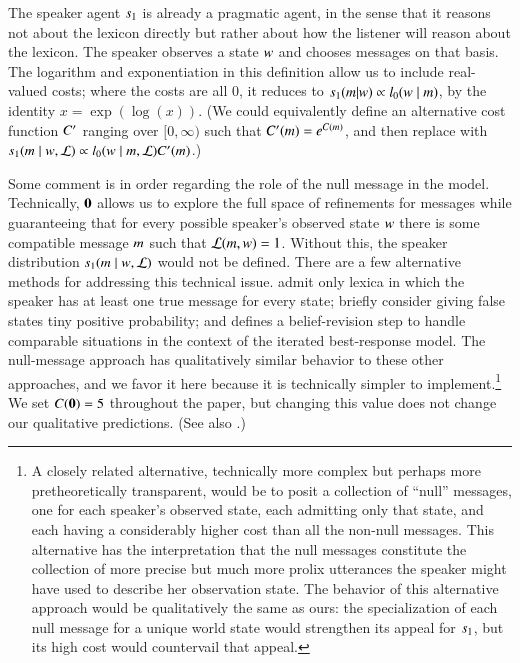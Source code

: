 \documentclass[leqno,12pt]{article}
\begin{document}

The speaker agent $s_{1}$ is already a pragmatic agent, in the
sense that it reasons not about the lexicon directly but rather about
how the listener will reason about the lexicon. The speaker observes a
state $w$ and chooses messages on that basis. The logarithm and
exponentiation in this definition allow us to include real-valued
costs; where the costs are all $0$, it reduces to
$s_{1}(m|w) \propto l_{0}(w \mid m)$,
by the identity $x = \exp(\log(x))$. (We could equivalently define an
alternative cost function $C'$ ranging over $[0,\infty)$ such
that $C'(m)=e^{C(m)}$, and then replace
 with
$s_{1}(m \mid w, \mathcal{L}) \propto
l_{0}(w \mid m,\mathcal{L}) C'(m)$.)

    

Some comment is in order regarding the role of the null message in the
model.  Technically, $\mathbf{0}$ allows us to explore the full space of
refinements for messages while guaranteeing that for every possible
speaker's observed state $w$ there is some compatible message
$m$ such that $\mathcal{L}(m, w) = 1$.  Without this, the speaker
distribution $s_{1}(m \mid w, \mathcal{L})$ would not be
defined.  There are a few alternative methods for addressing this
technical issue. \citet{Bergen:Goodman:Levy:2012} admit only lexica in
which the speaker has at least one true message for every state;
\citet{Bergen:Levy:Goodman:2014} briefly consider giving false states
tiny positive probability; and \citet{Jaeger:2011} defines a
belief-revision step to handle comparable situations in the context of
the iterated best-response model. The null-message approach has
qualitatively similar behavior to these other approaches, and we favor
it here because it is technically simpler to implement.\footnote{A
  closely related alternative, technically more complex but perhaps
  more pretheoretically transparent, would be to posit a collection of
  ``null'' messages, one for each speaker's observed state, each
  admitting only that state, and each having a considerably higher
  cost than all the non-null messages. This alternative has the
  interpretation that the null messages constitute the collection of
  more precise but much more prolix utterances the speaker might have
  used to describe her observation state.  The behavior of this
  alternative approach would be qualitatively the same as ours: the
  specialization of each null message for a unique world state would
  strengthen its appeal for $s_{1}$, but its high cost would
  countervail that appeal.}  We set $C(\mathbf{0}) = 5$ throughout
the paper, but changing this value does not change our qualitative
predictions.  (See also .)
\end{document}
